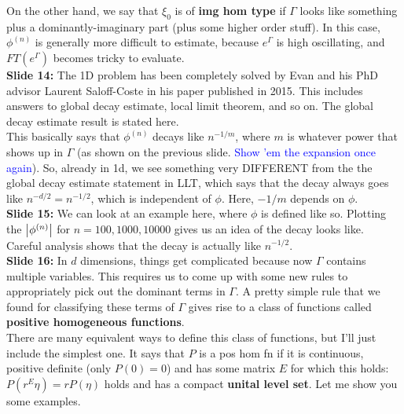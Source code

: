 \documentclass[11pt]{article}
\begin{document}
On the other hand, we say that $\xi_0$ is of \textbf{img hom type} if $\Gamma$ looks like something plus a dominantly-imaginary part (plus some higher order stuff). In this case, $\phi^{(n)}$ is generally more difficult to estimate, because $e^\Gamma$ is high oscillating, and $FT(e^\Gamma)$ becomes tricky to evaluate. \\




\noindent \textbf{Slide 14: } The 1D problem has been completely solved by Evan and his PhD advisor Laurent Saloff-Coste in his paper published in 2015. This includes answers to global decay estimate, local limit theorem, and so on. The global decay estimate result is stated here. \\

This basically says that $\phi^{(n)}$ decays like $n^{-1/m}$, where $m$ is whatever power that shows up in $\Gamma$ (as shown on the previous slide. \textcolor{blue}{Show 'em the expansion once again}). So, already in 1d, we see something very DIFFERENT from the the global decay estimate statement in LLT, which says that the decay always goes like $n^{-d/2} = n^{-1/2}$, which is independent of $\phi$. Here, $-1/m$ depends on $\phi$. \\




\noindent \textbf{Slide 15:} We can look at an example here, where $\phi$ is defined like so. Plotting the $\abs{\phi^{(n)}}$ for $n=100, 1000, 10000$ gives us an idea of the decay looks like. Careful analysis shows that the decay is actually like $n^{-1/2}$. \\





\noindent \textbf{Slide 16:}  In $d$ dimensions, things get complicated because now $\Gamma$ contains multiple variables. This requires us to come up with some new rules to appropriately pick out the dominant terms in $\Gamma$. A pretty simple rule that we found for classifying these terms of $\Gamma$ gives rise to a class of functions called \textbf{positive homogeneous functions}. \\



There are many equivalent ways to define this class of functions, but I'll just include the simplest one. It says that $P$ is a pos hom fn if it is continuous, positive definite (only $P(0) = 0$) and has some matrix $E$ for which this holds: $P(r^E\eta ) = rP(\eta)$ holds and has a compact \textbf{unital level set}. Let me show you some examples. \\
\end{document}
